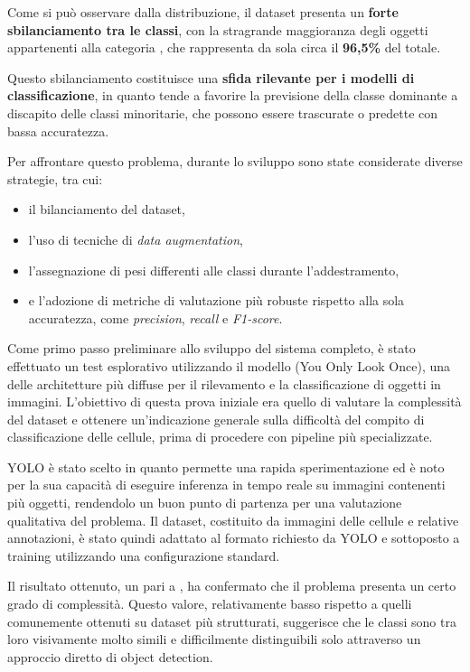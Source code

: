\documentclass[minted, draw]{../tex/hebdomon}
\begin{document}
Come si può osservare dalla distribuzione, il dataset presenta un \textbf{forte sbilanciamento tra le classi}, con la stragrande maggioranza degli oggetti appartenenti alla categoria , che rappresenta da sola circa il \textbf{96{,}5\%} del totale.

Questo sbilanciamento costituisce una \textbf{sfida rilevante per i modelli di classificazione}, in quanto tende a favorire la previsione della classe dominante a discapito delle classi minoritarie, che possono essere trascurate o predette con bassa accuratezza.

Per affrontare questo problema, durante lo sviluppo sono state considerate diverse strategie, tra cui:
\begin{itemize}
   \item il bilanciamento del dataset,
   \item l’uso di tecniche di \textit{data augmentation},
   \item l’assegnazione di pesi differenti alle classi durante l’addestramento,
   \item e l’adozione di metriche di valutazione più robuste rispetto alla sola accuratezza, come \textit{precision}, \textit{recall} e \textit{F1-score}.
\end{itemize}



Come primo passo preliminare allo sviluppo del sistema completo, è stato effettuato un test esplorativo utilizzando il modello  (You Only Look Once), una delle architetture più diffuse per il rilevamento e la classificazione di oggetti in immagini. L’obiettivo di questa prova iniziale era quello di valutare la complessità del dataset e ottenere un’indicazione generale sulla difficoltà del compito di classificazione delle cellule, prima di procedere con pipeline più specializzate.

YOLO è stato scelto in quanto permette una rapida sperimentazione ed è noto per la sua capacità di eseguire inferenza in tempo reale su immagini contenenti più oggetti, rendendolo un buon punto di partenza per una valutazione qualitativa del problema. Il dataset, costituito da immagini delle cellule e relative annotazioni, è stato quindi adattato al formato richiesto da YOLO e sottoposto a training utilizzando una configurazione standard.

Il risultato ottenuto, un  pari a , ha confermato che il problema presenta un certo grado di complessità. Questo valore, relativamente basso rispetto a quelli comunemente ottenuti su dataset più strutturati, suggerisce che le classi sono tra loro visivamente molto simili e difficilmente distinguibili solo attraverso un approccio diretto di object detection.
\end{document}
